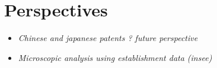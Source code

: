 \section{Perspectives}

\begin{itemize}
\item \textit{Chinese and japanese patents ? future perspective}
\item \textit{Microscopic analysis using establishment data (insee)}
\end{itemize}

 


\newpage





